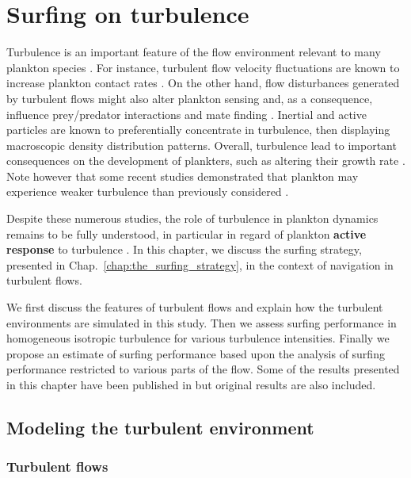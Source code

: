\chapter{Surfing on turbulence}\label{chap:surfing_on_turbulence}

Turbulence is an important feature of the flow environment relevant to many plankton species \citep{fuchs2016seascape}.
For instance, turbulent flow velocity fluctuations are known to increase plankton contact rates \citep{rothschild1988small}.
On the other hand, flow disturbances generated by turbulent flows might also alter plankton sensing and, as a consequence, influence prey/predator interactions \citep{saiz1995predatory, pecseli2019feeding} and mate finding \citep{michalec2020efficient}.
Inertial and active particles are known to preferentially concentrate \citep{monchaux2012analyzing, gustavsson2016preferential} in turbulence, then displaying macroscopic density distribution patterns.
Overall, turbulence lead to important consequences on the development of plankters, such as altering their growth rate \citep{peters2000effects}.
Note however that some recent studies demonstrated that plankton may experience weaker turbulence than previously considered \citep{franks2022oceanic}.

Despite these numerous studies, the role of turbulence in plankton dynamics remains to be fully understood, in particular in regard of plankton \textbf{active response} to turbulence \citep{franks2022oceanic}.
In this chapter, we discuss the surfing strategy, presented in Chap.~\ref{chap:the_surfing_strategy}, in the context of navigation in turbulent flows.

We first discuss the features of turbulent flows and explain how the turbulent environments are simulated in this study.
Then we assess surfing performance in homogeneous isotropic turbulence for various turbulence intensities.
Finally we propose an estimate of surfing performance based upon the analysis of surfing performance restricted to various parts of the flow. 
Some of the results presented in this chapter have been published in \citet{monthiller2022surfing} but original results are also included.

\section{Modeling the turbulent environment}\label{sec:simulating_turbulent_flows}

\subsection{Turbulent flows}


